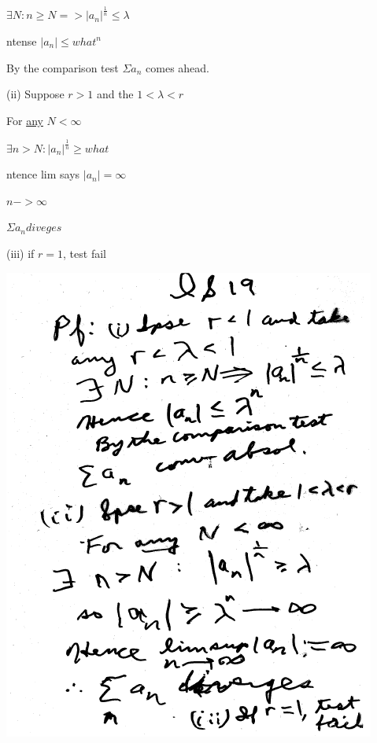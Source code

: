 \documentclass[10pt,a4paper]{article}
\begin{document}
{{$\exists N: n \geq N => |a_{n}|^{\frac{1}{n}} \leq \lambda$

ntense $|a_{n}| \leq what^{n}$

By the comparison test $\Sigma a_{n}$ comes ahead.

(ii) Suppose $r>1$ and the $1<\lambda<r$

For {\underline {any}} $N < \infty$

$\exists n > N : |a_{n}|^{\frac{1}{n}} \geq what$

ntence lim says $|a_{n}| = \infty$

$n->\infty$

$\Sigma a_{n} diveges$

(iii) if $r=1$, test fail

\begin{center}

\includegraphics[scale=.7]{Pages/IS_19}

\end{center}

\newpage %

\begin{center}


\end{center}}}
\end{document}
